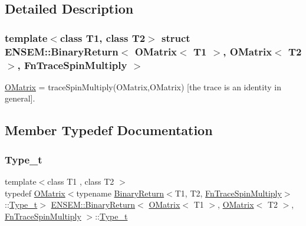 \subsection{Detailed Description}
\subsubsection*{template$<$class T1, class T2$>$\newline
struct E\+N\+S\+E\+M\+::\+Binary\+Return$<$ O\+Matrix$<$ T1 $>$, O\+Matrix$<$ T2 $>$, Fn\+Trace\+Spin\+Multiply $>$}

\mbox{\hyperlink{classENSEM_1_1OMatrix}{O\+Matrix}} = trace\+Spin\+Multiply(\+O\+Matrix,\+O\+Matrix) \mbox{[}the trace is an identity in general\mbox{]}. 

\subsection{Member Typedef Documentation}
\mbox{\label{structENSEM_1_1BinaryReturn_3_01OMatrix_3_01T1_01_4_00_01OMatrix_3_01T2_01_4_00_01FnTraceSpinMultiply_01_4_a3c030373855e8dde629b2051471b5d72}} 
\subsubsection{\texorpdfstring{Type\_t}{Type\_t}\hspace{0.1cm}{\footnotesize\ttfamily [1/3]}}
{\footnotesize\ttfamily template$<$class T1 , class T2 $>$ \\
typedef \mbox{\hyperlink{classENSEM_1_1OMatrix}{O\+Matrix}}$<$typename \mbox{\hyperlink{structENSEM_1_1BinaryReturn}{Binary\+Return}}$<$T1, T2, \mbox{\hyperlink{structENSEM_1_1FnTraceSpinMultiply}{Fn\+Trace\+Spin\+Multiply}}$>$\+::\mbox{\hyperlink{structENSEM_1_1BinaryReturn_3_01OMatrix_3_01T1_01_4_00_01OMatrix_3_01T2_01_4_00_01FnTraceSpinMultiply_01_4_a3c030373855e8dde629b2051471b5d72}{Type\+\_\+t}}$>$ \mbox{\hyperlink{structENSEM_1_1BinaryReturn}{E\+N\+S\+E\+M\+::\+Binary\+Return}}$<$ \mbox{\hyperlink{classENSEM_1_1OMatrix}{O\+Matrix}}$<$ T1 $>$, \mbox{\hyperlink{classENSEM_1_1OMatrix}{O\+Matrix}}$<$ T2 $>$, \mbox{\hyperlink{structENSEM_1_1FnTraceSpinMultiply}{Fn\+Trace\+Spin\+Multiply}} $>$\+::\mbox{\hyperlink{structENSEM_1_1BinaryReturn_3_01OMatrix_3_01T1_01_4_00_01OMatrix_3_01T2_01_4_00_01FnTraceSpinMultiply_01_4_a3c030373855e8dde629b2051471b5d72}{Type\+\_\+t}}}

